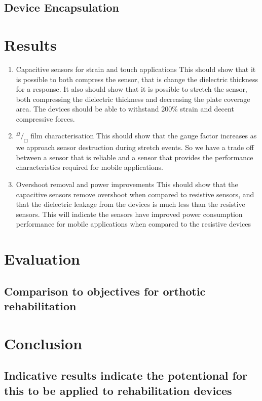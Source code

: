 \documentclass[11pt,twoside,a4paper]{article}
\newcommand*\rfrac[2]{{}^{#1}\!/_{#2}}
\begin{document}
		\subsection{Device Encapsulation}
	\newpage
	\section{Results}
		\begin{enumerate}
			\item Capacitive sensors for strain and touch applications \newline
				This should show that it is possible to both compress the sensor, that is change the dielectric thickness for a response. It also should show that it is possible to stretch 				the sensor, both compressing the dielectric thickness and decreasing the plate coverage area. The devices should be able to withstand 200\% strain and decent 					compressive forces.
			\item $ \rfrac{\Omega}{\Box} $ film characterisation \newline
				This should show that the gauge factor increases as we approach sensor destruction during stretch events. So we have a trade off between a sensor that is reliable 	
				and a sensor that provides the performance characteristics required for mobile applications.
			\item Overshoot removal and power improvements \newline
				This should show that the capacitive sensors remove overshoot when compared to resistive sensors, and that the dielectric leakage from the devices is much less					than the resistive sensors. This will indicate the sensors have improved power consumption performance for mobile applications when compared to the resistive 						devices
		\end{enumerate}
	\newpage
	\section{Evaluation}
		\subsection{Comparison to objectives for orthotic rehabilitation}
	\newpage
	\section{Conclusion}
		\subsection{Indicative results indicate the potentional for this to be applied to rehabilitation devices}
\end{document}
